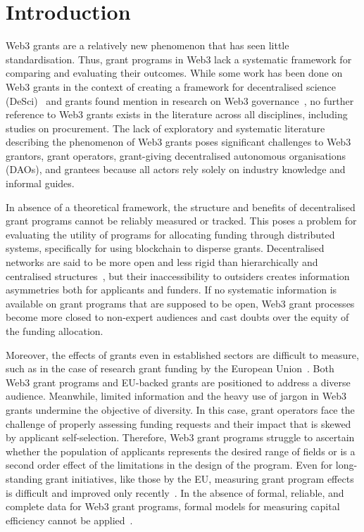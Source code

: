 \documentclass[conference]{IEEEtran}
\begin{document}
\section{Introduction}\label{sec_1}
Web3 grants are a relatively new phenomenon that has seen little standardisation. Thus, grant programs in Web3 lack a systematic framework for comparing and evaluating their outcomes. While some work has been done on Web3 grants in the context of creating a framework for decentralised science (DeSci)~\cite{ding_desci_2022} and grants found mention in research on Web3 governance~\cite{allen_exchange_2022}, no further reference to Web3 grants exists in the literature across all disciplines, including studies on procurement. The lack of exploratory and systematic literature describing the phenomenon of Web3 grants poses significant challenges to Web3 grantors, grant operators, grant-giving decentralised autonomous organisations (DAOs), and grantees because all actors rely solely on industry knowledge and informal guides.

In absence of a theoretical framework, the structure and benefits of decentralised grant programs cannot be reliably measured or tracked. This poses a problem for evaluating the utility of programs for allocating funding through distributed systems, specifically for using blockchain to disperse grants. Decentralised networks are said to be more open and less rigid than hierarchically and centralised structures~\cite{ding_desci_2022}, but their inaccessibility to outsiders creates information asymmetries both for applicants and funders. If no systematic information is available on grant programs that are supposed to be open, Web3 grant processes become more closed to non-expert audiences and cast doubts over the equity of the funding allocation.

Moreover, the effects of grants even in established sectors are difficult to measure, such as in the case of research grant funding by the European Union~\cite{selebaj_effects_2021}. Both Web3 grant programs and EU-backed grants are positioned to address a diverse audience. Meanwhile, limited information and the heavy use of jargon in Web3 grants undermine the objective of diversity. In this case, grant operators face the challenge of properly assessing funding requests and their impact that is skewed by applicant self-selection. Therefore, Web3 grant programs struggle to ascertain whether the population of applicants represents the desired range of fields or is a second order effect of the limitations in the design of the program. Even for long-standing grant initiatives, like those by the EU, measuring grant program effects is difficult and improved only recently~\cite{selebaj_effects_2021}. In the absence of formal, reliable, and complete data for Web3 grant programs, formal models for measuring capital efficiency cannot be applied~\cite{ odewole_capital_2020}.
\end{document}
